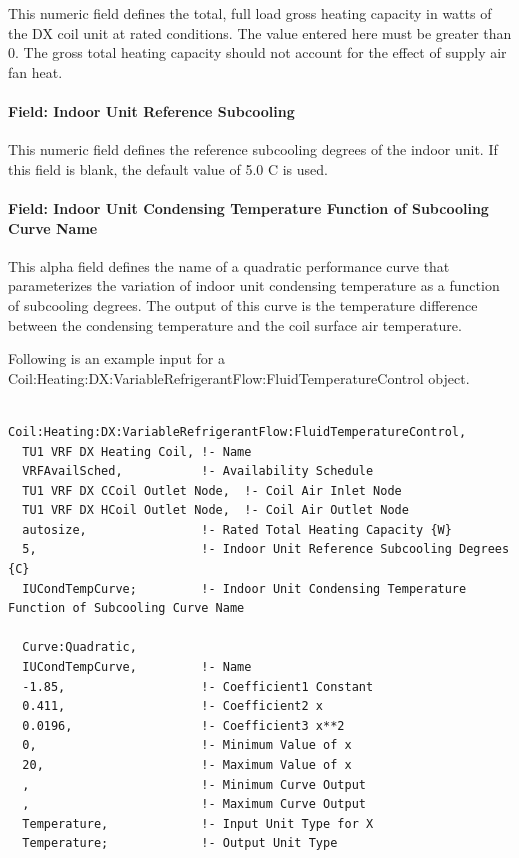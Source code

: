 This numeric field defines the total, full load gross heating capacity in watts of the DX coil unit at rated conditions. The value entered here must be greater than 0. The gross total heating capacity should not account for the effect of supply air fan heat.

\paragraph{Field: Indoor Unit Reference Subcooling}\label{field-indoor-unit-reference-subcooling}

This numeric field defines the reference subcooling degrees of the indoor unit. If this field is blank, the default value of 5.0 C is used.

\paragraph{Field: Indoor Unit Condensing Temperature Function of Subcooling Curve Name}\label{field-indoor-unit-condensing-temperature-function-of-subcooling-curve-name}

This alpha field defines the name of a quadratic performance curve that parameterizes the variation of indoor unit condensing temperature as a function of subcooling degrees. The output of this curve is the temperature difference between the condensing temperature and the coil surface air temperature.

Following is an example input for a Coil:Heating:DX:VariableRefrigerantFlow:FluidTemperatureControl object.

\begin{lstlisting}

Coil:Heating:DX:VariableRefrigerantFlow:FluidTemperatureControl,
  TU1 VRF DX Heating Coil, !- Name
  VRFAvailSched,           !- Availability Schedule
  TU1 VRF DX CCoil Outlet Node,  !- Coil Air Inlet Node
  TU1 VRF DX HCoil Outlet Node,  !- Coil Air Outlet Node
  autosize,                !- Rated Total Heating Capacity {W}
  5,                       !- Indoor Unit Reference Subcooling Degrees {C}
  IUCondTempCurve;         !- Indoor Unit Condensing Temperature Function of Subcooling Curve Name

  Curve:Quadratic,
  IUCondTempCurve,         !- Name
  -1.85,                   !- Coefficient1 Constant
  0.411,                   !- Coefficient2 x
  0.0196,                  !- Coefficient3 x**2
  0,                       !- Minimum Value of x
  20,                      !- Maximum Value of x
  ,                        !- Minimum Curve Output
  ,                        !- Maximum Curve Output
  Temperature,             !- Input Unit Type for X
  Temperature;             !- Output Unit Type
\end{lstlisting}

